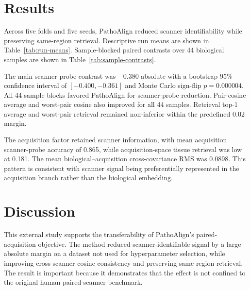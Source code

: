 \documentclass[11pt]{article}
\begin{document}
\section{Results}

Across five folds and five seeds, PathoAlign reduced scanner identifiability while preserving same-region retrieval. Descriptive run means are shown in Table~\ref{tab:run-means}. Sample-blocked paired contrasts over 44 biological samples are shown in Table~\ref{tab:sample-contrasts}.

\begin{table}[ht]
\centering
\caption{Locked five-fold descriptive run means.}
\label{tab:run-means}

\end{table}

\begin{table}[ht]
\centering
\caption{Sample-blocked PathoAlign minus paired-reference contrasts over 44 biological samples.}
\label{tab:sample-contrasts}

\end{table}

The main scanner-probe contrast was $-0.380$ absolute with a bootstrap 95\% confidence interval of $[-0.400, -0.361]$ and Monte Carlo sign-flip $p=0.000004$. All 44 sample blocks favored PathoAlign for scanner-probe reduction. Pair-cosine average and worst-pair cosine also improved for all 44 samples. Retrieval top-1 average and worst-pair retrieval remained non-inferior within the predefined 0.02 margin.

The acquisition factor retained scanner information, with mean acquisition scanner-probe accuracy of 0.865, while acquisition-space tissue retrieval was low at 0.181. The mean biological--acquisition cross-covariance RMS was 0.0898. This pattern is consistent with scanner signal being preferentially represented in the acquisition branch rather than the biological embedding.

\section{Discussion}

This external study supports the transferability of PathoAlign's paired-acquisition objective. The method reduced scanner-identifiable signal by a large absolute margin on a dataset not used for hyperparameter selection, while improving cross-scanner cosine consistency and preserving same-region retrieval. The result is important because it demonstrates that the effect is not confined to the original human paired-scanner benchmark.
\end{document}
